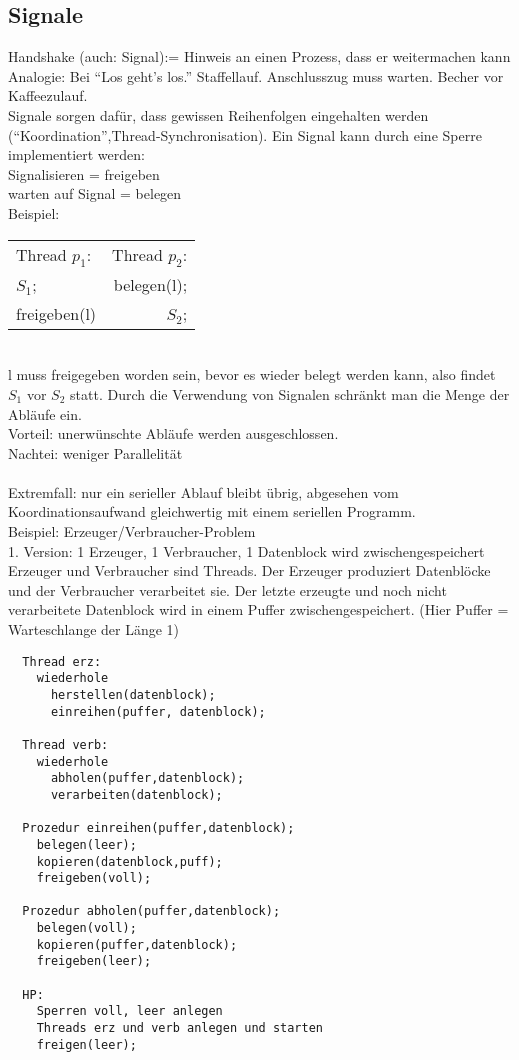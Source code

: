 \documentclass[a4paper,12pt]{scrartcl}
\begin{document}
\subsection{Signale}

Handshake (auch: Signal):= Hinweis an einen Prozess, dass er weitermachen kann\\
Analogie: Bei "`Los geht's los."' Staffellauf. Anschlusszug muss warten. Becher vor Kaffeezulauf.\\
Signale sorgen dafür, dass gewissen Reihenfolgen eingehalten werden ("`Koordination"',Thread-Synchronisation). Ein Signal kann durch eine Sperre implementiert werden:\\
Signalisieren = freigeben\\
warten auf Signal = belegen\\
Beispiel:\\
\begin{tabular}{l r}
  Thread $p_1$: & Thread $p_2$:\\
  $S_1$; & belegen(l);\\
  freigeben(l) & $S_2$;
\end{tabular}\\


l muss freigegeben worden sein, bevor es wieder belegt werden kann, also findet $S_1$ vor $S_2$ statt. Durch die Verwendung von Signalen schränkt man die Menge der Abläufe ein.\\
Vorteil: unerwünschte Abläufe werden ausgeschlossen.\\
Nachtei: weniger Parallelität\\
\\
Extremfall: nur ein serieller Ablauf bleibt übrig, abgesehen vom Koordinationsaufwand gleichwertig mit einem seriellen Programm.\\
Beispiel: Erzeuger/Verbraucher-Problem\\

1. Version: 1 Erzeuger, 1 Verbraucher, 1 Datenblock wird zwischengespeichert\\
Erzeuger und Verbraucher sind Threads. Der Erzeuger produziert Datenblöcke und der Verbraucher verarbeitet sie. Der letzte erzeugte und noch nicht verarbeitete Datenblock wird in einem Puffer zwischengespeichert. (Hier Puffer = Warteschlange der Länge 1)\\
\begin{lstlisting}
  Thread erz:
    wiederhole
      herstellen(datenblock);
      einreihen(puffer, datenblock);
  
  Thread verb:
    wiederhole
      abholen(puffer,datenblock);
      verarbeiten(datenblock);
      
  Prozedur einreihen(puffer,datenblock);
    belegen(leer);
    kopieren(datenblock,puff);
    freigeben(voll);
    
  Prozedur abholen(puffer,datenblock);
    belegen(voll);
    kopieren(puffer,datenblock);
    freigeben(leer);
    
  HP:
    Sperren voll, leer anlegen
    Threads erz und verb anlegen und starten
    freigen(leer);
\end{lstlisting}
\end{document}
